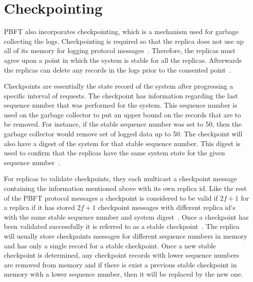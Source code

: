 \section{Checkpointing}
PBFT also incorporates checkpointing, which is a mechanism used for garbage collecting the logs. Checkpointing is required so that the replica does not use up all of its memory for logging protocol messages~\cite[p.~261]{BOOK:BuildDepDistSyst}. Therefore, the replicas must agree upon a point in which the system is stable for all the replicas. Afterwards the replicas can delete any records in the logs prior to the consented point~\cites[p.~5]{PAPER:OGPBFT}[p.~410]{PAPER:PBFTRecovery}. 

Checkpoints are essentially the state record of the system after progressing a specific interval of requests. The checkpoint has information regarding the last sequence number that was performed for the system. This sequence number is used on the garbage collector to put an upper bound on the records that are to be removed. For instance, if the stable sequence number was set to 50, then the garbage collector would remove set of logged data up to 50. The checkpoint will also have a digest of the system for that stable sequence number. This digest is used to confirm that the replicas have the same system state for the given sequence number~\cites[p.~5]{PAPER:OGPBFT}[p.~410]{PAPER:PBFTRecovery}. 

For replicas to validate checkpoints, they each multicast a checkpoint message containing the information mentioned above with its own replica id. Like the rest of the PBFT protocol messages a checkpoint is considered to be valid if $2f+1$ for a replica if it has stored $2f+1$ checkpoint messages with different replica id`s with the same stable sequence number and system digest~\cites[p.~261-262]{BOOK:BuildDepDistSyst}[p.~5]{PAPER:OGPBFT}[p.~410]{PAPER:PBFTRecovery}. Once a checkpoint has been validated successfully it is referred to as a stable checkpoint~\cites[p.~3]{PAPER:DPBFT}[p.~261]{BOOK:BuildDepDistSyst}. The replica will usually store checkpoints messages for different sequence numbers in memory and has only a single record for a stable checkpoint. Once a new stable checkpoint is determined, any checkpoint records with lower sequence numbers are removed from memory and if there is exist a previous stable checkpoint in memory with a lower sequence number, then it will be replaced by the new one.

